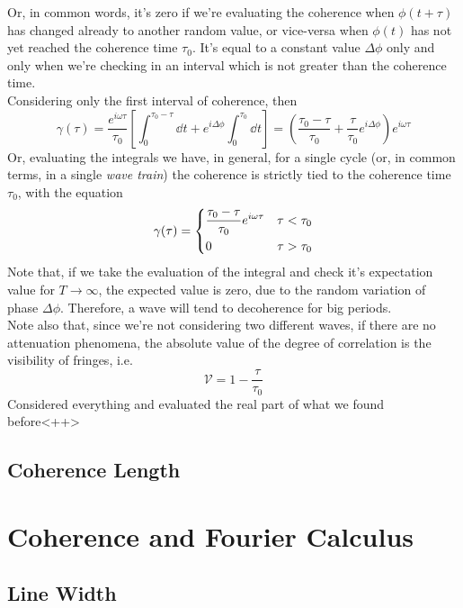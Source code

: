 \documentclass[../electromagnetism.tex]{subfiles}
\begin{document}
Or, in common words, it's zero if we're evaluating the coherence when $\phi(t+\tau)$ has changed already to another random value, or vice-versa when $\phi(t)$ has not yet reached the coherence time $\tau_0$. It's equal to a constant value $\Delta\phi$ only and only when we're checking in an interval which is not greater than the coherence time.\\
Considering only the first interval of coherence, then 
\begin{equation*}
	\gamma(\tau)=\frac{e^{i\omega\tau}}{\tau_0}\left[ \int_{0}^{\tau_0-\tau}\dd^{}{t}+e^{i\Delta\phi}\int_{0}^{\tau_0}\dd^{}{t} \right]=\left( \frac{\tau_0-\tau}{\tau_0}+\frac{\tau}{\tau_0}e^{i\Delta\phi} \right)e^{i\omega\tau}
\end{equation*}
Or, evaluating the integrals we have, in general, for a single cycle (or, in common terms, in a single \textit{wave train}) the coherence is strictly tied to the coherence time $\tau_0$, with the equation
\begin{equation}
	\gamma(\tau)=\begin{dcases}
		\frac{\tau_0-\tau}{\tau_0}e^{i\omega\tau}&\tau<\tau_0\\
		0&\tau>\tau_0
	\end{dcases}
	\label{eq:correlationfuncwave.ctm}
\end{equation}
Note that, if we take the evaluation of the integral and check it's expectation value for $T\to\infty$, the expected value is zero, due to the random variation of phase $\Delta\phi$. Therefore, a wave will tend to decoherence for big periods.\\
Note also that, since we're not considering two different waves, if there are no attenuation phenomena, the absolute value of the degree of correlation is the visibility of fringes, i.e. 
\begin{equation}
	\mathcal{V}=1-\frac{\tau}{\tau_0}
	\label{eq:vis.ctm}
\end{equation}
Considered everything and evaluated the real part of what we found before<++> 
\subsection{Coherence Length}
\section{Coherence and Fourier Calculus}
\subsection{Line Width}
\end{document}
